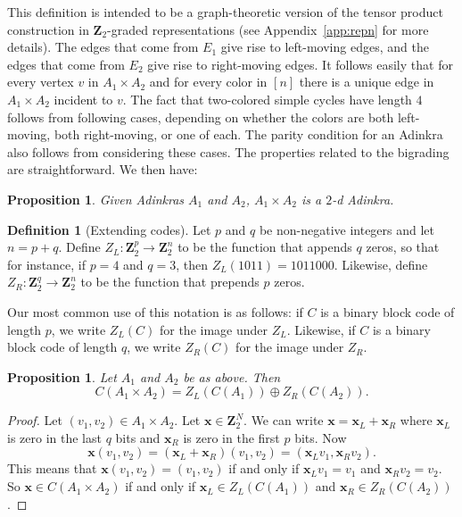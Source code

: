 \documentclass[12pt,twoside,singlespace]{article}
\numberwithin{equation}{section}
\newtheorem{prop}[equation]{Proposition}
\theoremstyle{definition}
\newtheorem{definition}[equation]{Definition}
\newcommand{\ZZ}{\mathbf{Z}}
\renewcommand{\vec}[1]{\mathbf{#1}}
\begin{document}
This definition is intended to be a graph-theoretic version of the tensor product construction in $\ZZ_2$-graded representations (see Appendix~\ref{app:repn} for more details).  The edges that come from $E_1$ give rise to left-moving edges, and the edges that come from $E_2$ give rise to right-moving edges.  It follows easily that for every vertex $v$ in $A_1\times A_2$ and for every color in $[n]$ there is a unique edge in $A_1\times A_2$ incident to $v$.  The fact that two-colored simple cycles have length $4$ follows from following cases, depending on whether the colors are both left-moving, both right-moving, or one of each.  The parity condition for an Adinkra also follows from considering these cases.  The properties related to the bigrading are straightforward.  We then have:

\begin{prop}
\label{prop:product-admissable}
Given Adinkras $A_1$ and $A_2$, $A_1\times A_2$ is a $2$-d Adinkra.
\end{prop}


\begin{definition}[Extending codes]
Let $p$ and $q$ be non-negative integers and let $n=p+q$.  Define $Z_L:\ZZ_2^p\to\ZZ_2^n$ to be the function that appends $q$ zeros, so that for instance, if $p=4$ and $q=3$, then $Z_L(1011)=1011000$.  Likewise, define $Z_R:\ZZ_2^q\to\ZZ_2^n$ to be the function that prepends $p$ zeros.

Our most common use of this notation is as follows: if $C$ is a binary block code of length $p$, we write $Z_L(C)$ for the image under $Z_L$.  Likewise, if $C$ is a binary block code of length $q$, we write $Z_R(C)$ for the image under $Z_R$.
\end{definition}

\begin{prop}
\label{prop:prodcode}
Let $A_1$ and $A_2$ be as above.  Then
\[C(A_1\times A_2)=Z_L(C(A_1))\oplus Z_R(C(A_2)).\]
\end{prop}
\begin{proof}
Let $(v_1,v_2)\in A_1\times A_2$.  Let $\vec{x}\in \ZZ_2^N$.  We can write $\vec{x}=\vec{x}_L+\vec{x}_R$ where $\vec{x}_L$ is zero in the last $q$ bits and $\vec{x}_R$ is zero in the first $p$ bits.  Now
\[\vec{x}(v_1,v_2)=(\vec{x}_L+\vec{x}_R)(v_1,v_2)=(\vec{x}_Lv_1,\vec{x}_Rv_2).\]
This means that $\vec{x}(v_1,v_2)=(v_1,v_2)$ if and only if $\vec{x}_Lv_1=v_1$ and $\vec{x}_R v_2=v_2$. So $\vec{x}\in C(A_1\times A_2)$ if and only if $\vec{x}_L\in Z_L(C(A_1))$ and $\vec{x}_R\in Z_R(C(A_2))$.
\end{proof}
\end{document}
